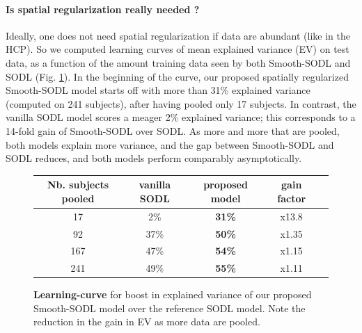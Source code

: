         
\paragraph{Is spatial regularization really needed ?}
Ideally, one does not need spatial regularization if data are abundant (like in the HCP). So we computed learning curves of mean explained variance (EV) on test data, as a function of the amount training data seen by both Smooth-SODL and SODL   \citep{mairal2010} (Fig. \ref{fig:ev}).
In the beginning of the curve, our proposed spatially regularized Smooth-SODL model starts off with more than 31\% explained variance (computed on 241 subjects), after having pooled only 17 subjects. In contrast, the vanilla SODL model   \citep{mairal2010} scores a meager 2\% explained variance; this corresponds  to a 14-fold gain of Smooth-SODL over SODL. As more and more that are pooled, both models explain more variance, and the gap between Smooth-SODL and SODL reduces, and both models perform comparably asymptotically. %

\begin{figure}[!htp]
 \begin{tabular}{|c|c|c|c|c}\hline%
    {Nb. subjects pooled} & {vanilla SODL} & {proposed model} & {gain factor} \\ \hline
17 & {2\%} & \bf{31\%} & {x13.8}\\\hline
92 & 37\% & \bf{50\%} & x1.35\\\hline
167 & 47\% & \bf{54\%} & x1.15\\\hline
241 & 49\% & \bf{55\%} & x1.11\\
  \end{tabular}
 \caption{\textbf{Learning-curve} for boost in explained variance of our proposed Smooth-SODL model over the reference SODL model.
   Note the reduction in the gain in EV as more data are pooled.}
 \label{fig:ev}
\end{figure}



